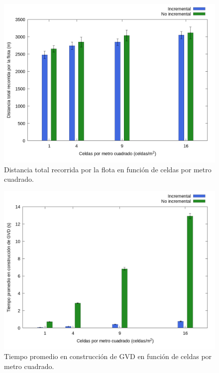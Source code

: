 \begin{figure}[H]
  \centerfloat

  \includegraphics[clip=true, width=\graphlen]{imagenes/graficas_chicas/graficas_histo_num/incrementalidad/exploration_cost.png}

  \caption{Distancia total recorrida por la flota  en función de celdas por metro cuadrado.}\label{fig:gra:inc:ec}

\end{figure}

\begin{figure}[H]
  \centerfloat

  \includegraphics[clip=true, width=\graphlen]{imagenes/graficas_chicas/graficas_histo_num/incrementalidad/gvd_construction_time_mean.png}

  \caption{Tiempo promedio en construcción de GVD en función de celdas por metro cuadrado.}\label{fig:gra:inc:gvdt}

\end{figure}


